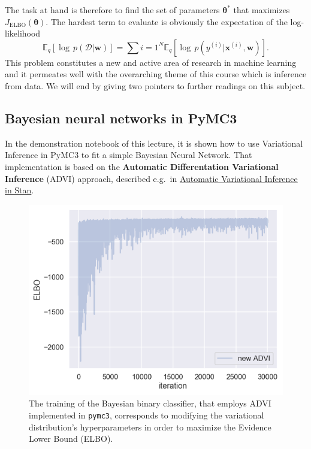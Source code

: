 \documentclass[%
oneside,                 %
final,                   %
10pt]{article}
\begin{document}
The task at hand is therefore to find the set of parameters $\boldsymbol{\theta}^*$ that maximizes $J_\mathrm{ELBO}(\boldsymbol{\theta})$. The hardest term to evaluate is obviously the expectation of the log-likelihood
\[
\mathbb{E}_{q} \left[ \log \, p(\mathcal{D} \lvert \boldsymbol{w}) \right]
= \sum{i=1}^N \mathbb{E}_{q} \left[ \log \, p( y^{(i)} \lvert \boldsymbol{x}^{(i)}, \boldsymbol{w}) \right].
\]
This problem constitutes a new and active area of research in machine learning and it permeates well with the overarching theme of this course which is inference from data. We will end by giving two pointers to further readings on this subject.

\subsection{Bayesian neural networks in PyMC3}
In the demonstration notebook of this lecture, it is shown how to use Variational Inference in PyMC3 to fit a simple Bayesian Neural Network. That implementation is based on the \textbf{Automatic Differentation Variational Inference} (ADVI) approach, described e.g.~in \href{{https://arxiv.org/abs/1506.03431}}{Automatic Variational Inference in Stan}.


\begin{figure}[!ht]  %
  \centerline{\includegraphics[width=0.6\linewidth]{fig/ADVI-classifier_ELBO.png}}
  \caption{
  The training of the Bayesian binary classifier, that employs ADVI implemented in \texttt{pymc3}, corresponds to modifying the variational distribution's hyperparameters in order to maximize the Evidence Lower Bound (ELBO).
  }
\end{figure}
\end{document}

